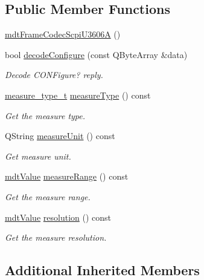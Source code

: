 \subsection*{Public Member Functions}
\begin{DoxyCompactItemize}
\item 
\hyperlink{classmdt_frame_codec_scpi_u3606_a_a7b0c88789b6ee6db56158215b7a499be}{mdt\-Frame\-Codec\-Scpi\-U3606\-A} ()
\item 
bool \hyperlink{classmdt_frame_codec_scpi_u3606_a_a178cc4f868b15b8c4591d8333afa84e4}{decode\-Configure} (const Q\-Byte\-Array \&data)
\begin{DoxyCompactList}\small\item\em Decode C\-O\-N\-Figure? reply. \end{DoxyCompactList}\item 
\hyperlink{classmdt_frame_codec_scpi_u3606_a_a3d7a1de14d77797a08e3d2991fa9f004}{measure\-\_\-type\-\_\-t} \hyperlink{classmdt_frame_codec_scpi_u3606_a_a590c72641f56e0f0db6547244b3643ef}{measure\-Type} () const 
\begin{DoxyCompactList}\small\item\em Get the measure type. \end{DoxyCompactList}\item 
Q\-String \hyperlink{classmdt_frame_codec_scpi_u3606_a_a866b905ad811baa00342d2a33174f69b}{measure\-Unit} () const 
\begin{DoxyCompactList}\small\item\em Get measure unit. \end{DoxyCompactList}\item 
\hyperlink{classmdt_value}{mdt\-Value} \hyperlink{classmdt_frame_codec_scpi_u3606_a_a068f91a459ddefa33e79ace763fc87fa}{measure\-Range} () const 
\begin{DoxyCompactList}\small\item\em Get the measure range. \end{DoxyCompactList}\item 
\hyperlink{classmdt_value}{mdt\-Value} \hyperlink{classmdt_frame_codec_scpi_u3606_a_a4b2d46f6256bd804c85200a2bc1d4dda}{resolution} () const 
\begin{DoxyCompactList}\small\item\em Get the measure resolution. \end{DoxyCompactList}\end{DoxyCompactItemize}
\subsection*{Additional Inherited Members}


